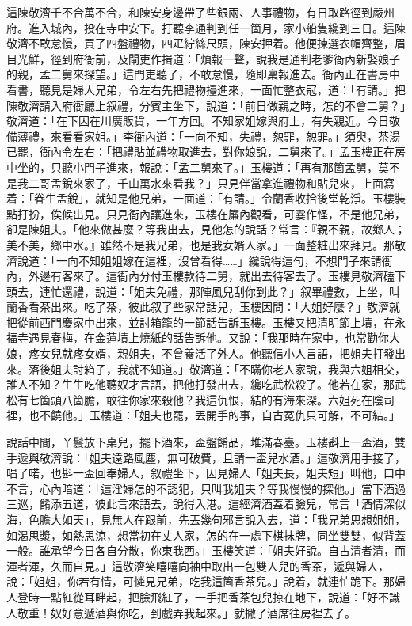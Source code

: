 這陳敬濟千不合萬不合，和陳安身邊帶了些銀兩、人事禮物，有日取路徑到嚴州府。{}進入城內，投在寺中安下。打聽李通判到任一箇月，家小船隻纔到三日。這陳敬濟不敢怠慢，買了四盤禮物，四疋紵絲尺頭，陳安押着。他便揀選衣帽齊整，眉目光鮮，徑到府衙前，及閘吏作揖道：「煩報一聲，說我是通判老爹衙內新娶娘子的親，孟二舅來探望。」這門吏聽了，不敢怠慢，隨即稟報進去。衙內正在書房中看書，聽見是婦人兄弟，令左右先把禮物擡進來，一面忙整衣冠，道：「有請。」把陳敬濟請入府衙廳上叙禮，分賓主坐下，說道：「前日做親之時，怎的不會二舅？」敬濟道：「在下因在川廣販貨，一年方回。不知家姐嫁與府上，有失親近。今日敬備薄禮，來看看家姐。」李衙內道：「一向不知，失禮，恕罪，恕罪。」須臾，茶湯已罷，衙內令左右：「把禮貼並禮物取進去，對你娘說，二舅來了。」孟玉樓正在房中坐的，只聽小門子進來，報說：「孟二舅來了。」玉樓道：「再有那箇孟舅，莫不是我二哥孟銳來家了，千山萬水來看我？」只見伴當拿進禮物和貼兒來，上面寫着：「眷生孟銳」，就知是他兄弟，一面道：「有請。」令蘭香收拾後堂乾淨。玉樓裝點打扮，俟候出見。只見衙內讓進來，玉樓在簾內觀看，可霎作怪，不是他兄弟，卻是陳姐夫。「他來做甚麼？等我出去，見他怎的說話？常言：『親不親，故鄉人；美不美，鄉中水。』雖然不是我兄弟，也是我女婿人家。」一面整粧出來拜見。那敬濟說道：「一向不知姐姐嫁在這裡，沒曾看得……」纔說得這句，不想門子來請衙內，外邊有客來了。這衙內分付玉樓款待二舅，就出去待客去了。玉樓見敬濟磕下頭去，連忙還禮，說道：「姐夫免禮，那陣風兒刮你到此？」叙畢禮數，上坐，叫蘭香看茶出來。吃了茶，彼此叙了些家常話兒，玉樓因問：「大姐好麼？」敬濟就把從前西門慶家中出來，並討箱籠的一節話告訴玉樓。玉樓又把清明節上墳，在永福寺遇見春梅，在金蓮墳上燒紙的話告訴他。又說：「我那時在家中，也常勸你大娘，疼女兒就疼女婿，親姐夫，不曾養活了外人。他聽信小人言語，把姐夫打發出來。落後姐夫討箱子，我就不知道。」敬濟道：「不瞞你老人家說，我與六姐相交，誰人不知？{}生生吃他聽奴才言語，把他打發出去，纔吃武松殺了。他若在家，那武松有七箇頭八箇膽，敢往你家來殺他？我這仇恨，結的有海來深。六姐死在陰司裡，也不饒他。」玉樓道：「姐夫也罷，丟開手的事，自古冤仇只可解，不可結。」

說話中間，丫鬟放下桌兒，擺下酒來，盃盤餚品，堆滿春臺。玉樓斟上一盃酒，雙手遞與敬濟說：「姐夫遠路風塵，無可破費，且請一盃兒水酒。」這敬濟用手接了，唱了喏，也斟一盃回奉婦人，叙禮坐下，因見婦人「姐夫長，姐夫短」叫他，口中不言，心內暗道：「這淫婦怎的不認犯，只叫我姐夫？等我慢慢的探他。」當下酒過三巡，餚添五道，彼此言來語去，說得入港。這經濟酒蓋着臉兒，常言「酒情深似海，色膽大如天」，見無人在跟前，先丟幾句邪言說入去，道：「我兄弟思想姐姐，如渴思漿，如熱思涼，想當初在丈人家，怎的在一處下棋抹牌，同坐雙雙，似背蓋一般。誰承望今日各自分散，你東我西。」{}玉樓笑道：「姐夫好說。自古清者清，而渾者渾，久而自見。」這敬濟笑嘻嘻向袖中取出一包雙人兒的香茶，遞與婦人，說：「姐姐，你若有情，可憐見兄弟，吃我這箇香茶兒。」說着，就連忙跪下。那婦人登時一點紅從耳畔起，把臉飛紅了，一手把香茶包兒掠在地下，說道：「好不識人敬重！奴好意遞酒與你吃，到戲弄我起來。」就撇了酒席往房裡去了。

